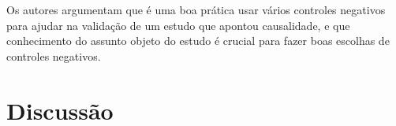\documentclass[final,5p]{elsarticle}
\numberwithin{equation}{section}
\begin{document}
    Os autores argumentam que é uma boa prática usar vários controles negativos para ajudar na validação de um estudo que apontou causalidade, e que conhecimento do assunto objeto do estudo é crucial para fazer boas escolhas de controles negativos.

\section{Discussão}












\end{document}
